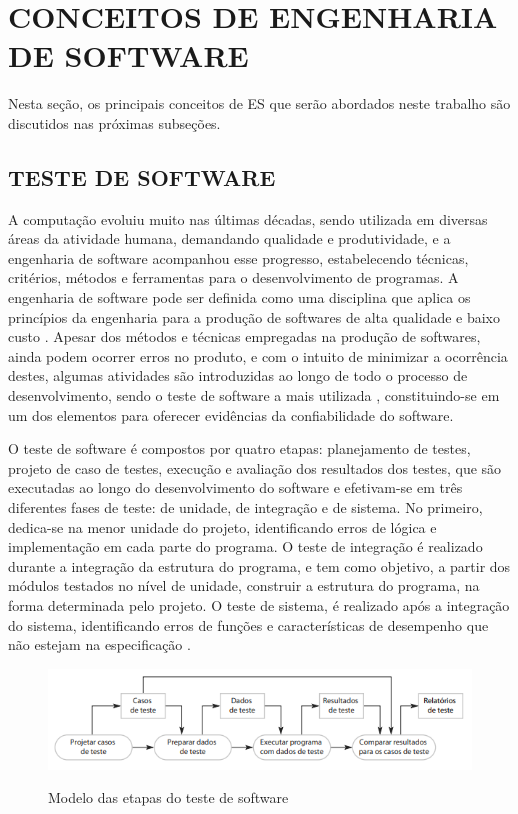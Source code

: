 \section{CONCEITOS DE ENGENHARIA DE SOFTWARE}
\label{sec:engenhariaDeSoftware}
Nesta seção, os principais conceitos de ES que serão abordados neste trabalho são discutidos nas próximas subseções.

\subsection{TESTE DE SOFTWARE}
\label{subsec:testeDeSoftware} A computação evoluiu muito nas últimas décadas, sendo utilizada em diversas áreas da atividade humana, demandando qualidade e produtividade, e a engenharia de software acompanhou esse progresso, estabelecendo técnicas, critérios, métodos e ferramentas para o desenvolvimento de programas. A engenharia de software pode ser definida como uma disciplina que aplica os princípios da engenharia para a produção de softwares de alta qualidade e baixo custo \cite{Pressman1997}. Apesar dos métodos e técnicas empregadas na produção de softwares, ainda podem ocorrer erros no produto, e com o intuito de minimizar a ocorrência destes, algumas atividades são introduzidas ao longo de todo o processo de desenvolvimento, sendo o teste de software a mais utilizada \cite{Maldonado1997}, constituindo-se em um dos elementos para oferecer evidências da confiabilidade do software.

O teste de software é compostos por quatro etapas: planejamento de testes, projeto de caso de testes, execução e avaliação dos resultados dos testes, que são executadas ao longo do desenvolvimento do software e efetivam-se em três diferentes fases de teste: de unidade, de integração e de sistema. No primeiro, dedica-se na menor unidade do projeto, identificando erros de lógica e implementação em cada parte do programa. O teste de integração é realizado durante a integração da estrutura do programa, e tem como objetivo, a partir dos módulos testados no nível de unidade, construir a estrutura do programa, na forma determinada pelo projeto. O teste de sistema, é realizado após a integração do sistema, identificando erros de funções e características de desempenho que não estejam na especificação \cite{Maldonado2004}.

\begin{figure}[!htb]
    \centering
    \caption{Modelo das etapas do teste de software}
    \includegraphics[width=1\textwidth]{./dados/figuras/Modelo_processo_de_software}
    \label{fig:figura-modelo-etapas-teste-de-software}
\end{figure}

